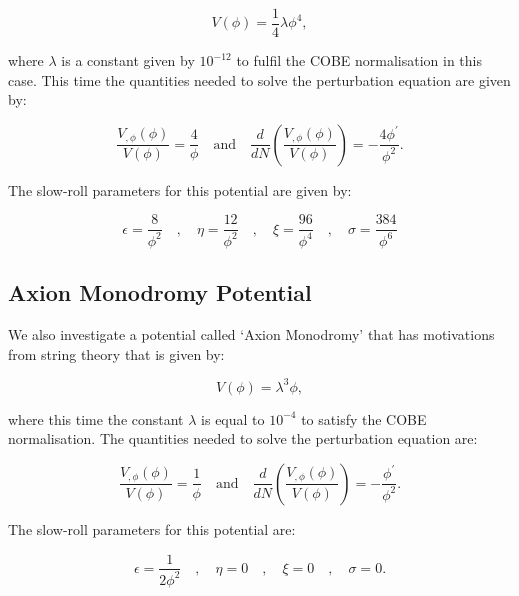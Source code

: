 \documentclass[a4paper,12pt,twoside]{report}
\begin{document}
\begin{equation}\label{eq3.40}
V(\phi) = \frac{1}{4} \lambda \phi^{4},
\end{equation}

where $\lambda$ is a constant given by $10^{-12}$ to fulfil the COBE normalisation in this case. This time the quantities needed to solve the perturbation equation are given by:

\begin{equation} \label{eq3.41}
\frac{V_{,\phi}(\phi)}{V(\phi)} = \frac{4}{\phi} \quad \mathrm{and} \quad \frac{d}{dN} \left( \frac{V_{,\phi}(\phi)}{V(\phi)} \right) = - \frac{4\phi^{\prime}}{\phi^{2}}.
\end{equation}

The slow-roll parameters for this potential are given by:

\begin{equation} \label{eq3.42}
\epsilon = \frac{8}{\phi^{2}} \quad , \quad \eta = \frac{12}{\phi^{2}} \quad , \quad \xi = \frac{96}{\phi^{4}} \quad , \quad \sigma = \frac{384}{\phi^{6}}
\end{equation}

\subsection{Axion Monodromy Potential} \label{subsec:AxoMonPot}

We also investigate a potential called `Axion Monodromy' that has motivations from string theory \cite{Silverstein:2008sg, Silverstein:2013wua} that is given by:

\begin{equation} \label{eq3.43}
V(\phi) = \lambda^{3} \phi,
\end{equation}

where this time the constant $\lambda$ is equal to $10^{-4}$ to satisfy the COBE normalisation. The quantities needed to solve the perturbation equation are:

\begin{equation} \label{eq3.44}
\frac{V_{,\phi}(\phi)}{V(\phi)} = \frac{1}{\phi} \quad \mathrm{and} \quad \frac{d}{dN} \left( \frac{V_{,\phi}(\phi)}{V(\phi)} \right) = - \frac{\phi^{\prime}}{\phi^{2}}.
\end{equation}

The slow-roll parameters for this potential are:

\begin{equation} \label{eq3.45}
\epsilon = \frac{1}{2\phi^{2}} \quad , \quad \eta = 0 \quad , \quad \xi = 0 \quad , \quad \sigma = 0.
\end{equation}
\end{document}
